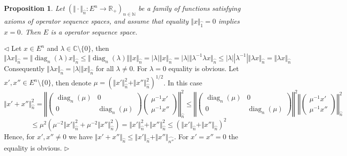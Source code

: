 \documentclass[12pt]{article}
\newtheorem{proposition}[theorem]{Proposition}
\newenvironment{proof}{\par $\triangleleft$}{$\triangleright$}
\begin{document}
\begin{proposition}\label{PrSQAxiomRed} Let
${(\Vert\cdot\Vert_{\wideparen{n}}:E^n\to\mathbb{R}_+)}_{n\in\mathbb{N}}$ be a
family of functions satisfying axioms of operator sequence spaces, and assume
that equality $\Vert x\Vert_{\wideparen{1}}=0$ implies $x=0$. Then $E$ is a
operator sequence space.
\end{proposition}
\begin{proof}
Let $x\in E^n$ and $\lambda\in \mathbb{C}\setminus \{0 \}$, then 
$$
\Vert\lambda x\Vert_{\wideparen{n}}
=\Vert\operatorname{diag}_n(\lambda)x\Vert_{\wideparen{n}}
\leq\Vert\operatorname{diag}_n(\lambda)\Vert\Vert x\Vert_{\wideparen{n}}
=|\lambda|\Vert x\Vert_{\wideparen{n}}
=|\lambda|\Vert\lambda^{-1}\lambda x\Vert_{\wideparen{n}}
\leq|\lambda||\lambda^{-1}|\Vert\lambda x\Vert_{\wideparen{n}}
=\Vert\lambda x\Vert_{\wideparen{n}}
$$
Consequently $\Vert\lambda x\Vert_{\wideparen{n}}=|\lambda|\Vert
x\Vert_{\wideparen{n}}$ for all $\lambda\neq 0$. For $\lambda=0$ equality is
obvious. Let $x',x''\in E^n\setminus \{0 \}$, then denote 
$\mu={(
    \Vert x'\Vert_{\wideparen{n}}^2+
    \Vert x''\Vert_{\wideparen{n}}^2)}^{1/2}$. 
In this case
$$
\Vert x'+x''\Vert_{\wideparen{n}}^2
=\left\Vert
    \begin{pmatrix}\operatorname{diag}_n(\mu) & 0\\ 
        0 & \operatorname{diag}_n(\mu)
    \end{pmatrix}
    \begin{pmatrix}
        \mu^{-1}x'\\ 
        \mu^{-1}x''
    \end{pmatrix}
\right\Vert_{\wideparen{n}}^2
\leq\left\Vert
    \begin{pmatrix}
        \operatorname{diag}_n(\mu) & 0\\ 0
         & \operatorname{diag}_n(\mu)
    \end{pmatrix}
\right\Vert^2
\left\Vert
    \begin{pmatrix}\mu^{-1}x'\\
        \mu^{-1}x''
    \end{pmatrix}
\right\Vert_{\wideparen{n}}^2
$$
$$
\leq\mu^2(\mu^{-2}\Vert x'\Vert_{\wideparen{n}}^2
+\mu^{-2}\Vert x''\Vert_{\wideparen{n}}^2)
=\Vert x'\Vert_{\wideparen{n}}^2+\Vert x''\Vert_{\wideparen{n}}^2
\leq {(\Vert x'\Vert_{\wideparen{n}}+\Vert x''\Vert_{\wideparen{n}})}^2
$$
Hence, for $x',x''\neq 0$ we have $\Vert x'+x''\Vert_{\wideparen{n}}\leq\Vert
x'\Vert_{\wideparen{n}}+\Vert x''\Vert_{\wideparen{n''}}$. For $x'=x''=0$ the
equality is obvious.
\end{proof}
\end{document}
